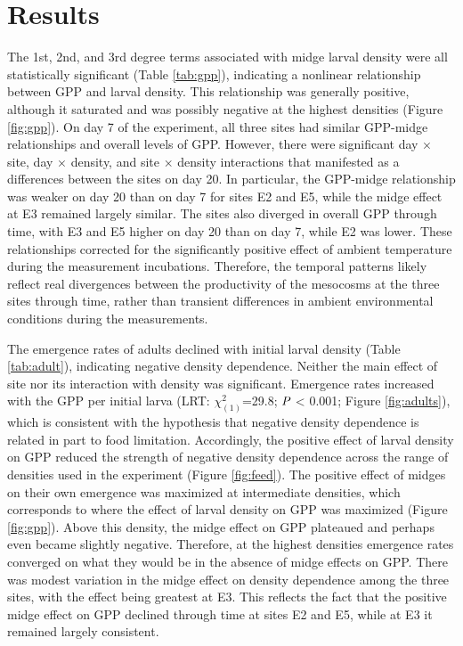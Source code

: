 

\section*{Results}
 
The 1st, 2nd, and 3rd degree terms associated with midge larval density
were all statistically significant (Table \ref{tab:gpp}), 
indicating a nonlinear relationship between GPP and larval density.
This relationship was generally positive, 
although it saturated 
and was possibly negative at the highest densities (Figure \ref{fig:gpp}).
On day 7 of the experiment, 
all three sites had similar GPP-midge relationships and overall levels of GPP.
However, there were significant day $\times$ site, day $\times$ density,
and site $\times$ density interactions that manifested as a differences
between the sites on day 20.
In particular, the GPP-midge relationship was weaker on day 20 than on day 7 for sites
E2 and E5, while the midge effect at E3 remained largely similar.
The sites also diverged in overall GPP through time,
with E3 and E5 higher on day 20 than on day 7,
while E2 was lower.
These relationships corrected for the significantly positive effect 
of ambient temperature during the measurement incubations.
Therefore, the temporal patterns likely reflect real divergences 
between the productivity of the mesocosms at the three sites through time, 
rather than transient differences in ambient environmental conditions during the measurements.

The emergence rates of adults declined with initial larval density 
(Table \ref{tab:adult}), 
indicating negative density dependence.
Neither the main effect of site nor its interaction with density was significant.
Emergence rates increased with the GPP per initial larva 
(LRT: $\chi^2_{(1)}$=29.8; $\emph{P}$ < 0.001; Figure \ref{fig:adults}),
which is consistent with the hypothesis that negative density dependence is 
related in part to food limitation.
Accordingly, the positive effect of larval density on GPP reduced the strength of 
negative density dependence across the range of densities 
used in the experiment (Figure \ref{fig:feed}).
The positive effect of midges on their own emergence was maximized at intermediate
densities, 
which corresponds to where the effect of larval density on GPP was maximized 
(Figure \ref{fig:gpp}).
Above this density, 
the midge effect on GPP plateaued and perhaps even became slightly negative. 
Therefore, at the highest densities emergence rates converged on what they would be 
in the absence of midge effects on GPP. 
There was modest variation in the midge effect on density dependence among the three sites,
with the effect being greatest at E3.
This reflects the fact that the positive midge effect on GPP declined through time
at sites E2 and E5, while at E3 it remained largely consistent. 

